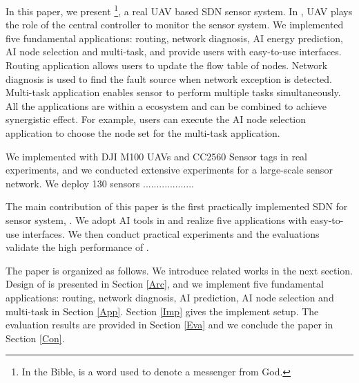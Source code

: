 In this paper, we present {\sdn}\footnote{In the Bible, {\sdn} is a word used to denote a messenger from God. }, 
a real UAV based SDN sensor system.
In {\sdn}, UAV plays the role of the central controller to monitor the sensor system.
We implemented five fundamental applications: routing, network diagnosis, 
AI energy prediction, AI node selection and multi-task,
and provide users with easy-to-use interfaces.
Routing application allows users to update the flow table of nodes.
Network diagnosis is used to find the fault source when network exception is detected.
Multi-task application enables sensor to perform multiple 
tasks simultaneously. All the applications are within a ecosystem
and can be combined to achieve synergistic effect. For example,
users can execute the AI node selection application to choose
the node set for the multi-task application. 


We implemented {\sdn} with DJI M100 UAVs and CC2560 Sensor tags in real experiments, and we conducted extensive experiments for a large-scale sensor network. We deploy 130 sensors ...................
\iffalse
Adler improves localization accuracy of $20$ sensors by reducing $78.4\%$ root-mean-square error (RMSE) compared to methods by multi-hop networks or mobile vehicles. Adler achieves about $10\%$ higher package receiving ratio compared to notable mobile sink methods for gathering application. Adler reduces sensors' average energy consumption by about $80\%$ compared to multi-hop based methods. When the number of sensor nodes increases or some nodes run out of energy, Adler is more resilient and holds better performance than the state-of-the-art methods.
\fi

The main contribution of this paper is the first practically implemented SDN for sensor system, {\sdn}. 
We adopt AI tools in {\sdn} and realize five applications with easy-to-use interfaces.
We then conduct practical experiments and the evaluations validate the high performance of {\sdn}.

The paper is organized as follows. We introduce related works in the next section. 
Design of {\sdn} is presented in Section \ref{Arc}, 
and we implement five fundamental applications: routing, network diagnosis, 
AI prediction, AI node selection and multi-task in Section \ref{App}. 
Section \ref{Imp} gives the implement setup.
The evaluation results are provided in Section \ref{Eva} 
and we conclude the paper in Section \ref{Con}.


